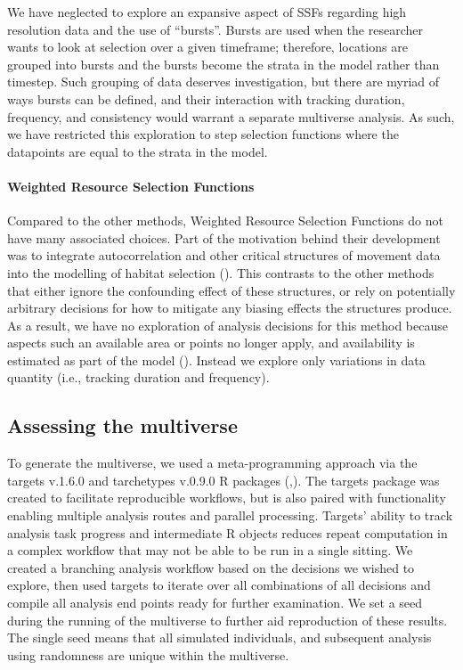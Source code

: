 \documentclass[10pt,a4paper]{article}
\begin{document}
We have neglected to explore an expansive aspect of SSFs regarding high resolution data and the use of ``bursts''.
Bursts are used when the researcher wants to look at selection over a given timeframe; therefore, locations are grouped into bursts and the bursts become the strata in the model rather than timestep.
Such grouping of data deserves investigation, but there are myriad of ways bursts can be defined, and their interaction with tracking duration, frequency, and consistency would warrant a separate multiverse analysis.
As such, we have restricted this exploration to step selection functions where the datapoints are equal to the strata in the model.

\paragraph{Weighted Resource Selection Functions}\label{weighted-resource-selection-functions}

Compared to the other methods, Weighted Resource Selection Functions do not have many associated choices.
Part of the motivation behind their development was to integrate autocorrelation and other critical structures of movement data into the modelling of habitat selection ().
This contrasts to the other methods that either ignore the confounding effect of these structures, or rely on potentially arbitrary decisions for how to mitigate any biasing effects the structures produce.
As a result, we have no exploration of analysis decisions for this method because aspects such an available area or points no longer apply, and availability is estimated as part of the model ().
Instead we explore only variations in data quantity (i.e., tracking duration and frequency).

\subsection{Assessing the multiverse}\label{assessing-the-multiverse}

To generate the multiverse, we used a meta-programming approach via the targets v.1.6.0 and tarchetypes v.0.9.0 R packages (,).
The targets package was created to facilitate reproducible workflows, but is also paired with functionality enabling multiple analysis routes and parallel processing.
Targets' ability to track analysis task progress and intermediate R objects reduces repeat computation in a complex workflow that may not be able to be run in a single sitting.
We created a branching analysis workflow based on the decisions we wished to explore, then used targets to iterate over all combinations of all decisions and compile all analysis end points ready for further examination.
We set a seed during the running of the multiverse to further aid reproduction of these results.
The single seed means that all simulated individuals, and subsequent analysis using randomness are unique within the multiverse.
\end{document}
